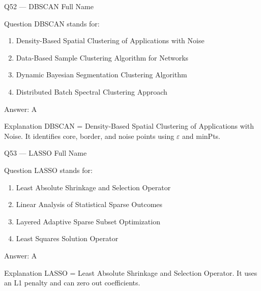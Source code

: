 \documentclass[aspectratio=169,8pt]{beamer}
\begin{document}
	\begin{frame}{Q52 --- DBSCAN Full Name}
		\begin{block}{Question}
			DBSCAN stands for:
			\begin{enumerate}
				\item Density-Based Spatial Clustering of Applications with Noise
				\item Data-Based Sample Clustering Algorithm for Networks
				\item Dynamic Bayesian Segmentation Clustering Algorithm
				\item Distributed Batch Spectral Clustering Approach
			\end{enumerate}
		\end{block}
		\begin{exampleblock}{Answer: A}\end{exampleblock}
		\begin{block}{Explanation}
			DBSCAN = Density-Based Spatial Clustering of Applications with Noise. It identifies core, border, and noise points using $\varepsilon$ and minPts.
		\end{block}
	\end{frame}
	
	\begin{frame}{Q53 --- LASSO Full Name}
		\begin{block}{Question}
			LASSO stands for:
			\begin{enumerate}
				\item Least Absolute Shrinkage and Selection Operator
				\item Linear Analysis of Statistical Sparse Outcomes
				\item Layered Adaptive Sparse Subset Optimization
				\item Least Squares Solution Operator
			\end{enumerate}
		\end{block}
		\begin{exampleblock}{Answer: A}\end{exampleblock}
		\begin{block}{Explanation}
			LASSO = Least Absolute Shrinkage and Selection Operator. It uses an L1 penalty and can zero out coefficients.
		\end{block}
	\end{frame}
	
\end{document}
